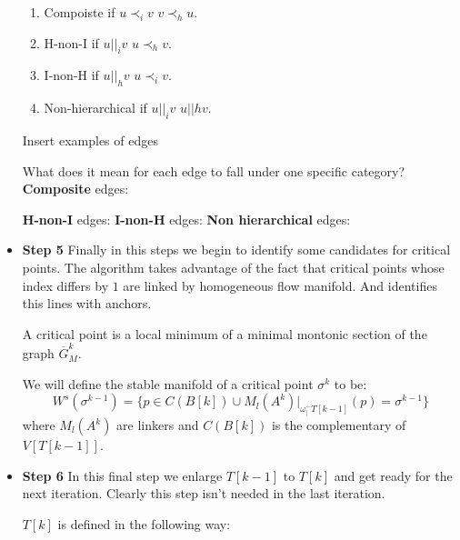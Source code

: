 \begin{itemize}
\begin{enumerate}
            \item Compoiste if $u\prec_{i}v$  $v\prec_{h}u$.

            \item H-non-I if $u\vert\vert_i v$  $u\prec_{h}v$.

            \item I-non-H if $u\vert\vert_h v$  $u\prec_{i}v$.

            \item Non-hierarchical if $u\vert\vert_i v$  $u\vert\vert{h}v$.
        \end{enumerate}

    {\color{red} Insert examples of edges}

    What does it mean for each edge to fall under one specific category? 
    {\bf Composite} edges:
        
    {\bf H-non-I} edges:
    {\bf I-non-H} edges:
    {\bf Non hierarchical} edges:
    \item {\bf Step 5}
        Finally in this steps we begin to identify some candidates for critical points.
        The algorithm takes advantage of the fact that critical points whose index differs by $1$ are linked by homogeneous 
        flow manifold. 
        And identifies this lines with anchors.

        \begin{definition}
            A critical point is a local minimum of a minimal montonic section of the graph 
            $\overbar G_M^k$.
            
            We will define the stable manifold of a critical point $\sigma^k$ to be:
            $$
            W^s(\sigma^{k-1})
            =
            \{
                p\in C(B[k])
                \cup M_l(A^k)\vert_{
                    \omega^-_\vert{T[k-1]}
                }
                (p)
                =\sigma^{k-1}
            \}
            $$
            where $M_l(A^k)$ are linkers
            and $C(B[k])$ is the complementary of $V[T[k-1]]$.
        \end{definition}

    \item {\bf Step 6}
        In this final step we enlarge $T[k-1]$ to $T[k]$ and get ready for the next iteration.
        Clearly this step isn't needed in the last iteration.
        
        $T[k]$ is defined in the following way:


\end{itemize}
